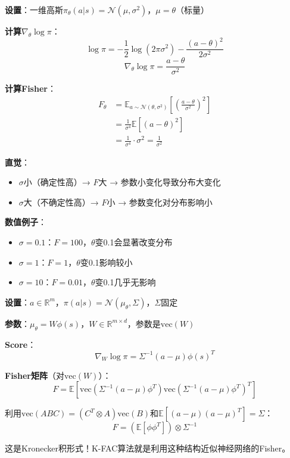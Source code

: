 \documentclass[11pt,a4paper]{article}
\theoremstyle{definition}
\begin{document}
\begin{calculation}[高斯策略的Fisher矩阵]
\textbf{设置}：一维高斯$\pi_\theta(a|s) = \mathcal{N}(\mu, \sigma^2)$，$\mu = \theta$（标量）

\textbf{计算$\nabla_\theta \log \pi$}：
\[
\log \pi = -\frac{1}{2}\log(2\pi\sigma^2) - \frac{(a-\theta)^2}{2\sigma^2}
\]
\[
\nabla_\theta \log \pi = \frac{a - \theta}{\sigma^2}
\]

\textbf{计算Fisher}：
\begin{align*}
F_\theta &= \mathbb{E}_{a \sim \mathcal{N}(\theta, \sigma^2)}\left[\left(\frac{a-\theta}{\sigma^2}\right)^2\right] \\
&= \frac{1}{\sigma^4} \mathbb{E}[(a-\theta)^2] \\
&= \frac{1}{\sigma^4} \cdot \sigma^2 = \frac{1}{\sigma^2}
\end{align*}

\textbf{直觉}：
\begin{itemize}
    \item $\sigma$小（确定性高）→ $F$大 → 参数小变化导致分布大变化
    \item $\sigma$大（不确定性高）→ $F$小 → 参数变化对分布影响小
\end{itemize}

\textbf{数值例子}：
\begin{itemize}
    \item $\sigma = 0.1$：$F = 100$，$\theta$变0.1会显著改变分布
    \item $\sigma = 1$：$F = 1$，$\theta$变0.1影响较小
    \item $\sigma = 10$：$F = 0.01$，$\theta$变0.1几乎无影响
\end{itemize}
\end{calculation}

\begin{calculation}[多维高斯的Fisher矩阵]
\textbf{设置}：$a \in \mathbb{R}^m$，$\pi(a|s) = \mathcal{N}(\mu_\theta, \Sigma)$，$\Sigma$固定

\textbf{参数}：$\mu_\theta = W\phi(s)$，$W \in \mathbb{R}^{m \times d}$，参数是$\text{vec}(W)$

\textbf{Score}：
\[
\nabla_W \log \pi = \Sigma^{-1}(a - \mu) \phi(s)^T
\]

\textbf{Fisher矩阵}（对$\text{vec}(W)$）：
\[
F = \mathbb{E}[\text{vec}(\Sigma^{-1}(a-\mu)\phi^T) \text{vec}(\Sigma^{-1}(a-\mu)\phi^T)^T]
\]

利用$\text{vec}(ABC) = (C^T \otimes A)\text{vec}(B)$和$\mathbb{E}[(a-\mu)(a-\mu)^T] = \Sigma$：
\[
F = (\mathbb{E}[\phi\phi^T]) \otimes \Sigma^{-1}
\]

这是Kronecker积形式！K-FAC算法就是利用这种结构近似神经网络的Fisher。
\end{calculation}
\end{document}
